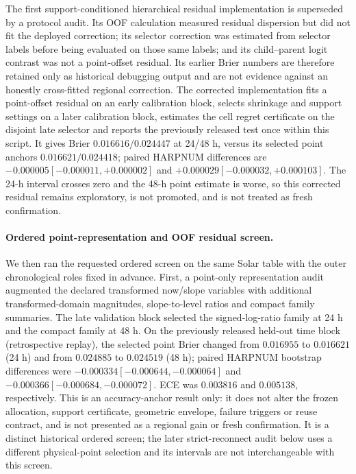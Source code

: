 \documentclass[11pt,a4paper]{article}
\numberwithin{equation}{section}
\theoremstyle{definition}\newtheorem{definition}[theorem]{Definition}
\theoremstyle{remark}\newtheorem{remark}[theorem]{Remark}
\begin{document}
The first support-conditioned hierarchical residual implementation is superseded by a protocol audit. Its OOF calculation measured residual dispersion but did not fit the deployed correction; its selector correction was estimated from selector labels before being evaluated on those same labels; and its child--parent logit contrast was not a point-offset residual. Its earlier Brier numbers are therefore retained only as historical debugging output and are not evidence against an honestly cross-fitted regional correction. The corrected implementation fits a point-offset residual on an early calibration block, selects shrinkage and support settings on a later calibration block, estimates the cell regret certificate on the disjoint late selector and reports the previously released test once within this script. It gives Brier $0.016616/0.024447$ at 24/48 h, versus its selected point anchors $0.016621/0.024418$; paired HARPNUM differences are $-0.000005[-0.000011,+0.000002]$ and $+0.000029[-0.000032,+0.000103]$. The 24-h interval crosses zero and the 48-h point estimate is worse, so this corrected residual remains exploratory, is not promoted, and is not treated as fresh confirmation.

\paragraph{Ordered point-representation and OOF residual screen.}
We then ran the requested ordered screen on the same Solar table with the outer chronological roles fixed in advance. First, a point-only representation audit augmented the declared transformed now/slope variables with additional transformed-domain magnitudes, slope-to-level ratios and compact family summaries. The late validation block selected the signed-log-ratio family at 24 h and the compact family at 48 h. On the previously released held-out time block (retrospective replay), the selected point Brier changed from $0.016955$ to $0.016621$ (24 h) and from $0.024885$ to $0.024519$ (48 h); paired HARPNUM bootstrap differences were $-0.000334[-0.000644,-0.000064]$ and $-0.000366[-0.000684,-0.000072]$. ECE was $0.003816$ and $0.005138$, respectively. This is an accuracy-anchor result only: it does not alter the frozen allocation, support certificate, geometric envelope, failure triggers or reuse contract, and is not presented as a regional gain or fresh confirmation. It is a distinct historical ordered screen; the later strict-reconnect audit below uses a different physical-point selection and its intervals are not interchangeable with this screen.
\end{document}
